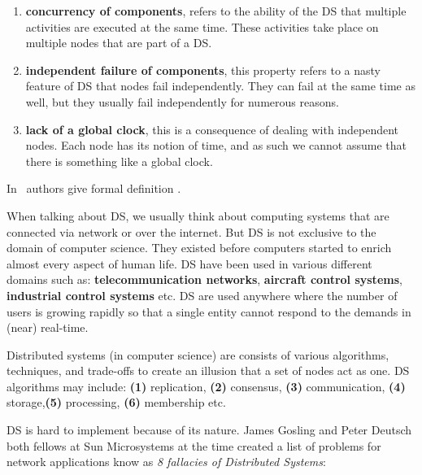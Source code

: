 \begin{enumerate}[start=1,label={(\bfseries \arabic*)}]
	\item \textbf{concurrency of components}, refers to the ability of the DS that multiple activities are executed at the same time. These activities take place on multiple nodes that are part of a DS.
	\item \textbf{independent failure of components}, this property refers to a nasty feature of DS that nodes fail independently. They can fail at the same time as well, but they usually fail independently for numerous reasons.
	\item \textbf{lack of a global clock}, this is a consequence of dealing with independent nodes. Each node has its notion of time, and as such we cannot assume that there is something like a global clock.
\end{enumerate} 

\noindent
In~\cite{SteenT16} authors give formal definition .

When talking about DS, we usually think about computing systems that are connected via network or over the internet. But DS is not exclusive to the domain of computer science. They existed before computers started to enrich almost every aspect of human life. DS have been used in various different domains such as: \textbf{telecommunication networks}, \textbf{aircraft control systems}, \textbf{industrial control systems} etc. DS are used anywhere where the number of users is growing rapidly so that a single entity cannot respond to the demands in (near) real-time.

Distributed systems (in computer science) are consists of various algorithms, techniques, and trade-offs to create an illusion that a set of nodes act as one. DS algorithms may include: \textbf{(1)} replication, \textbf{(2)} consensus, \textbf{(3)} communication, \textbf{(4)} storage,\textbf{(5)} processing, \textbf{(6)} membership etc.

DS is hard to implement because of its nature. James Gosling and Peter Deutsch both fellows at Sun Microsystems at the time created a list of problems for network applications know as \textit{8 fallacies of Distributed Systems}:\label{enum:fallacies}

